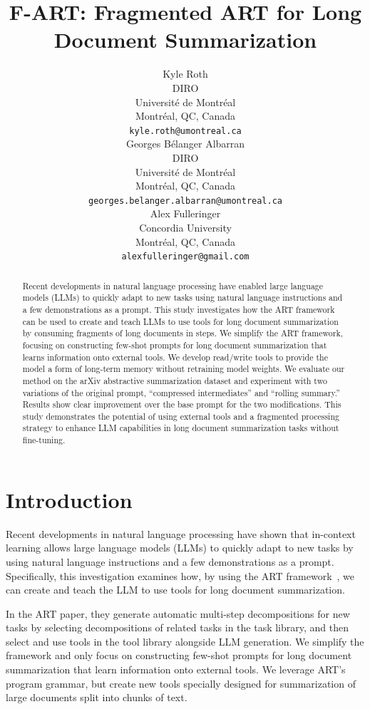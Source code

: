 \documentclass{article}
\title{F-ART: Fragmented ART for Long Document Summarization}
\author{%
  Kyle Roth \\
  DIRO \\
  Université de Montréal \\
  Montréal, QC, Canada \\
  \texttt{kyle.roth@umontreal.ca} \\
  \And
  Georges Bélanger Albarran \\
  DIRO \\
  Université de Montréal \\
  Montréal, QC, Canada \\
  \texttt{georges.belanger.albarran@umontreal.ca} \\
  \And
  Alex Fulleringer \\
  Concordia University \\
  Montréal, QC, Canada \\
  \texttt{alexfulleringer@gmail.com} \\
}
\begin{document}
\maketitle


\begin{abstract}
  Recent developments in natural language processing have enabled large language models (LLMs) to quickly adapt to new tasks using natural language instructions and a few demonstrations as a prompt. This study investigates how the ART framework can be used to create and teach LLMs to use tools for long document summarization by consuming fragments of long documents in steps. We simplify the ART framework, focusing on constructing few-shot prompts for long document summarization that learns information onto external tools. We develop read/write tools to provide the model a form of long-term memory without retraining model weights. We evaluate our method on the arXiv abstractive summarization dataset and experiment with two variations of the original prompt, ``compressed intermediates'' and ``rolling summary.'' Results show clear improvement over the base prompt for the two modifications. This study demonstrates the potential of using external tools and a fragmented processing strategy to enhance LLM capabilities in long document summarization tasks without fine-tuning.
\end{abstract}


\section{Introduction}
Recent developments in natural language processing have shown that in-context learning allows large language models (LLMs) to quickly adapt to new tasks by using natural language instructions and a few demonstrations as a prompt.
Specifically, this investigation examines how, by using the ART framework~\cite{paranjape2023art}, we can create and teach the LLM to use tools for long document summarization.

In the ART paper, they generate automatic multi-step decompositions for new tasks by selecting decompositions of related tasks in the task library, and then select and use tools in the tool library alongside LLM generation.
We simplify the framework and only focus on constructing few-shot prompts for long document summarization that learn information onto external tools. We leverage ART's program grammar, but create new tools specially designed for summarization of large documents split into chunks of text.
\end{document}
